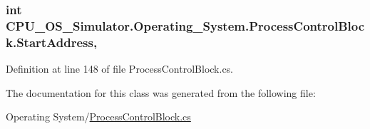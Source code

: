 \subsubsection[{Start\+Address}]{\setlength{\rightskip}{0pt plus 5cm}int C\+P\+U\+\_\+\+O\+S\+\_\+\+Simulator.\+Operating\+\_\+\+System.\+Process\+Control\+Block.\+Start\+Address\hspace{0.3cm}{\ttfamily [get]}, {\ttfamily [set]}}\label{class_c_p_u___o_s___simulator_1_1_operating___system_1_1_process_control_block_a0db4bf8588b286ebe82f80e3e00e2132}


Definition at line 148 of file Process\+Control\+Block.\+cs.



The documentation for this class was generated from the following file\+:\begin{DoxyCompactItemize}
\item 
Operating System/\hyperlink{_process_control_block_8cs}{Process\+Control\+Block.\+cs}\end{DoxyCompactItemize}
